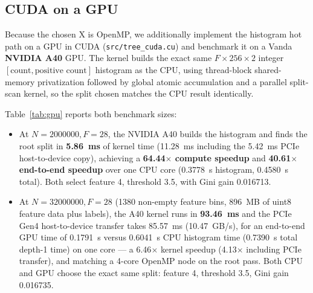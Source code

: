 \documentclass[11pt]{article}
\begin{document}
\subsection{CUDA on a GPU}

Because the chosen X is OpenMP, we additionally implement the histogram hot path on a GPU in CUDA (\texttt{src/tree\_cuda.cu}) and benchmark it on a Vanda \textbf{NVIDIA A40} GPU. The kernel builds the exact same $F\times 256\times 2$ integer $[\text{count},\text{positive count}]$ histogram as the CPU, using thread-block shared-memory privatization followed by global atomic accumulation and a parallel split-scan kernel, so the split chosen matches the CPU result identically.

\begin{table}[H]
\centering
\caption{NVIDIA A40 GPU vs.\ CPU histogram and root-split benchmark on Vanda ($F=\num{28}$; from \texttt{gpu\_20261110\_214122\_1536934.csv} and \texttt{gpu\_20261110\_235027\_1537453.csv}).}
\label{tab:gpu}
\end{table}

Table~\ref{tab:gpu} reports both benchmark sizes:
\begin{itemize}
  \item At $N=\num{2000000}, F=\num{28}$, the NVIDIA A40 builds the histogram and finds the root split in \textbf{\SI{5.86}{ms}} of kernel time (\SI{11.28}{ms} including the \SI{5.42}{ms} PCIe host-to-device copy), achieving a \textbf{\num{64.44}$\times$ compute speedup} and \textbf{\num{40.61}$\times$ end-to-end speedup} over one CPU core (\SI{0.3778}{s} histogram, \SI{0.4580}{s} total). Both select feature \num{4}, threshold \num{3.5}, with Gini gain \num{0.016713}.
  \item At $N=\num{32000000}, F=\num{28}$ (\num{1380} non-empty feature bins, \SI{896}{MB} of uint8 feature data plus labels), the A40 kernel runs in \textbf{\SI{93.46}{ms}} and the PCIe Gen4 host-to-device transfer takes \SI{85.57}{ms} (\SI{10.47}{GB/s}), for an end-to-end GPU time of \SI{0.1791}{s} versus \SI{0.6041}{s} CPU histogram time (\SI{0.7390}{s} total depth-1 time) on one core --- a \num{6.46}$\times$ kernel speedup (\num{4.13}$\times$ including PCIe transfer), and matching a 4-core OpenMP node on the root pass. Both CPU and GPU choose the exact same split: feature \num{4}, threshold \num{3.5}, Gini gain \num{0.016735}.
\end{itemize}
\end{document}
